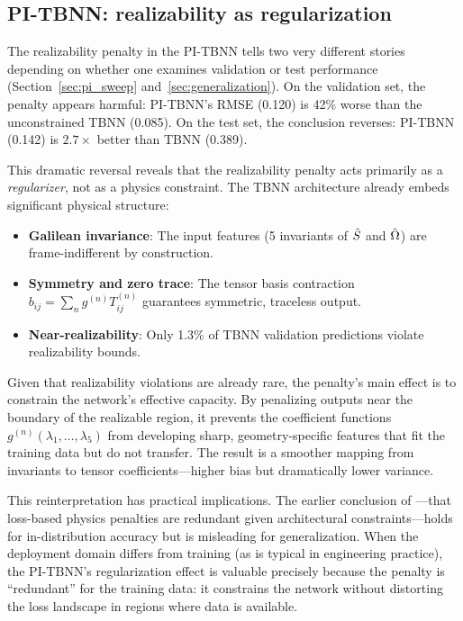 \subsection{PI-TBNN: realizability as regularization}

The realizability penalty in the PI-TBNN tells two very different stories depending on whether one examines validation or test performance (Section~\ref{sec:pi_sweep} and~\ref{sec:generalization}).
On the validation set, the penalty appears harmful: PI-TBNN's RMSE (0.120) is 42\% worse than the unconstrained TBNN (0.085).
On the test set, the conclusion reverses: PI-TBNN (0.142) is $2.7\times$ better than TBNN (0.389).

This dramatic reversal reveals that the realizability penalty acts primarily as a \emph{regularizer}, not as a physics constraint.
The TBNN architecture already embeds significant physical structure:
\begin{itemize}
    \item \textbf{Galilean invariance}: The input features (5 invariants of $\hat{S}$ and $\hat{\Omega}$) are frame-indifferent by construction.
    \item \textbf{Symmetry and zero trace}: The tensor basis contraction $b_{ij} = \sum_n g^{(n)} T^{(n)}_{ij}$ guarantees symmetric, traceless output.
    \item \textbf{Near-realizability}: Only 1.3\% of TBNN validation predictions violate realizability bounds.
\end{itemize}

Given that realizability violations are already rare, the penalty's main effect is to constrain the network's effective capacity.
By penalizing outputs near the boundary of the realizable region, it prevents the coefficient functions $g^{(n)}(\lambda_1,\ldots,\lambda_5)$ from developing sharp, geometry-specific features that fit the training data but do not transfer.
The result is a smoother mapping from invariants to tensor coefficients---higher bias but dramatically lower variance.

This reinterpretation has practical implications.
The earlier conclusion of \citet{Wu2018}---that loss-based physics penalties are redundant given architectural constraints---holds for in-distribution accuracy but is misleading for generalization.
When the deployment domain differs from training (as is typical in engineering practice), the PI-TBNN's regularization effect is valuable precisely because the penalty is ``redundant'' for the training data: it constrains the network without distorting the loss landscape in regions where data is available.


